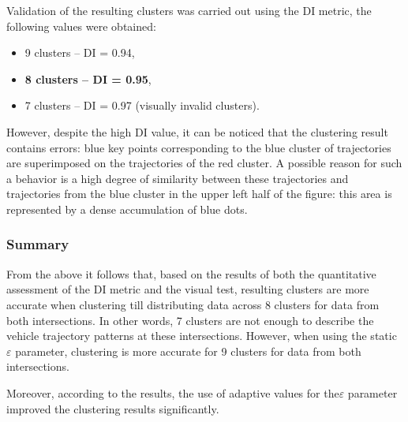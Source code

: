 Validation of the resulting clusters was carried out using the DI metric, the following values ​​were obtained:

\begin{itemize}
	\setlength\itemsep{0em}
	\item 9 clusters -- DI = 0.94,
	\item \textbf{8 clusters -- DI = 0.95},
	\item 7 clusters -- DI = 0.97 (visually invalid clusters).
\end{itemize}

However, despite the high DI value, it can be noticed that the clustering result contains errors: blue key points corresponding to the blue cluster of trajectories are superimposed on the trajectories of the red cluster. A possible reason for such a behavior is a high degree of similarity between these trajectories and trajectories from the blue cluster in the upper left half of the figure: this area is represented by a dense accumulation of blue dots.

\subsubsection{Summary}

From the above it follows that, based on the results of both the quantitative assessment of the DI metric and the visual test, resulting clusters are more accurate when clustering till distributing data across 8 clusters for data from both intersections. In other words, 7 clusters are not enough to describe the vehicle trajectory patterns at these intersections. However, when using the static $\varepsilon$ parameter, clustering is more accurate for 9 clusters for data from both intersections.

Moreover, according to the results, the use of adaptive values ​for the$\varepsilon$ parameter improved the clustering results significantly.
